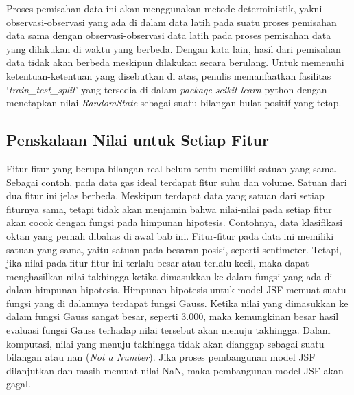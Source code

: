 \noindent Proses pemisahan data ini akan menggunakan metode deterministik, yakni observasi-observasi yang ada di dalam data latih pada suatu proses pemisahan data sama dengan observasi-observasi data latih pada proses pemisahan data yang dilakukan di waktu yang berbeda. Dengan kata lain, hasil dari pemisahan data tidak akan berbeda meskipun dilakukan secara berulang. Untuk memenuhi ketentuan-ketentuan yang disebutkan di atas, penulis memanfaatkan fasilitas `\emph{train\_test\_split}' yang tersedia di dalam \emph{package scikit-learn} python dengan menetapkan nilai \emph{RandomState} sebagai suatu bilangan bulat positif yang tetap.

\subsection{Penskalaan Nilai untuk Setiap Fitur}
\noindent Fitur-fitur yang berupa bilangan real belum tentu memiliki satuan yang sama. Sebagai contoh, pada data gas ideal terdapat fitur suhu dan volume. Satuan dari dua fitur ini jelas berbeda. Meskipun terdapat data yang satuan dari setiap fiturnya sama, tetapi tidak akan menjamin bahwa nilai-nilai pada setiap fitur akan cocok dengan fungsi pada himpunan hipotesis. Contohnya, data klasifikasi oktan yang pernah dibahas di awal bab ini. Fitur-fitur pada data ini memiliki satuan yang sama, yaitu satuan pada besaran posisi, seperti sentimeter. Tetapi, jika nilai pada fitur-fitur ini terlalu besar atau terlalu kecil, maka dapat menghasilkan nilai takhingga ketika dimasukkan ke dalam fungsi yang ada di dalam himpunan hipotesis. Himpunan hipotesis untuk model JSF memuat suatu fungsi yang di dalamnya terdapat fungsi Gauss. Ketika nilai yang dimasukkan ke dalam fungsi Gauss sangat besar, seperti 3.000, maka kemungkinan besar hasil evaluasi fungsi Gauss terhadap nilai tersebut akan menuju takhingga. Dalam komputasi, nilai yang menuju takhingga tidak akan dianggap sebagai suatu bilangan atau \gls{nan} (\emph{Not a Number}). Jika proses pembangunan model JSF dilanjutkan dan masih memuat nilai NaN, maka pembangunan model JSF akan gagal.

